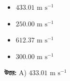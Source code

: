 \documentclass[12pt, a4paper]{article}
\begin{document}
\begin{itemize}[label={}, leftmargin=1cm, itemsep=0.5em]
    \item[\textbf{A)}] $433.01\text{ m s}^{-1}$
    \item[\textbf{B)}] $250.00\text{ m s}^{-1}$
    \item[\textbf{C)}] $612.37\text{ m s}^{-1}$
    \item[\textbf{D)}] $300.00\text{ m s}^{-1}$
\end{itemize}

\vspace{0.5em}
\begin{tcolorbox}[answerbox]
    \textbf{\color{success} উত্তর:} A) $433.01\text{ m s}^{-1}$
\end{tcolorbox}
\vspace{1em}
\end{document}
